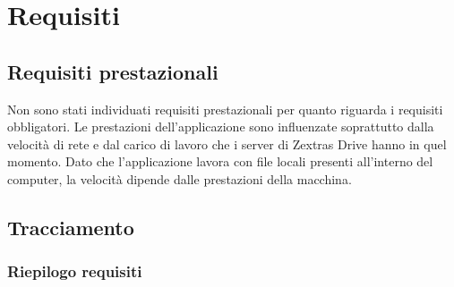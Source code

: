 \section{Requisiti}


\newpage


\newpage


\newpage

\subsection{Requisiti prestazionali}
Non sono stati individuati requisiti prestazionali per quanto riguarda i requisiti obbligatori. Le prestazioni dell'applicazione sono influenzate soprattutto dalla velocità di rete e dal carico di lavoro che i server di Zextras Drive hanno in quel momento.\newline
Dato che l'applicazione lavora con file locali presenti all'interno del computer, la velocità dipende dalle prestazioni della macchina.


\subsection{Tracciamento}

\newpage

\newpage
\subsubsection{Riepilogo requisiti}
